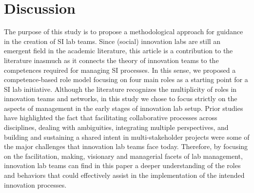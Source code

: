 \documentclass[AMA,STIX1COL,APA,STIX2COL]{WileyNJD-v2}
\begin{document}
\hypertarget{discussion}{%
\section{Discussion}\label{discussion}}

The purpose of this study is to propose a methodological approach for
guidance in the creation of SI lab teams. Since (social) innovation labs
are still an emergent field in the academic literature, this article is
a contribution to the literature inasmuch as it connects the theory of
innovation teams to the competences required for managing SI processes.
In this sense, we proposed a competence-based role model focusing on
four main roles as a starting point for a SI lab initiative. Although
the literature recognizes the multiplicity of roles in innovation teams
and networks, in this study we chose to focus strictly on the aspects of
management in the early stages of innovation lab setup. Prior studies
have highlighted the fact that facilitating collaborative processes
across disciplines, dealing with ambiguities, integrating multiple
perspectives, and building and sustaining a shared intent in
multi-stakeholder projects were some of the major challenges that
innovation lab teams face today. Therefore, by focusing on the
facilitation, making, visionary and managerial facets of lab management,
innovation lab teams can find in this paper a deeper understanding of
the roles and behaviors that could effectively assist in the
implementation of the intended innovation processes.
\end{document}
